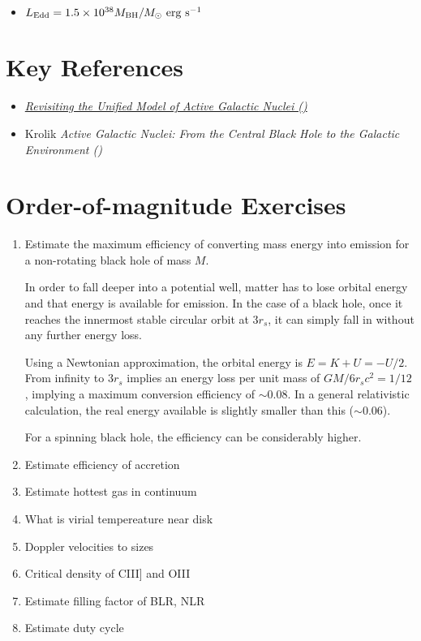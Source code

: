 \begin{itemize}
\item $L_{\rm Edd} = 1.5 \times 10^{38} M_{\rm BH} / M_\odot {\rm
~erg~s}^{-1}$
\end{itemize}

\section{Key References}

\begin{itemize}
  \item
    \href{https://ui.adsabs.harvard.edu/abs/2015ARA%26A..53..365N/abstract}
    {{\it Revisiting the Unified Model of Active Galactic Nuclei
      (\citealt{netzer15a})}}
  \item
    Krolik {\it Active Galactic Nuclei: From the Central Black Hole to
    the Galactic Environment (\citealt{krolik99a})}
\end{itemize}

\section{Order-of-magnitude Exercises}

\begin{enumerate} 
\item Estimate the maximum efficiency of converting mass energy
    into emission for a non-rotating black hole of mass $M$.

\begin{answer}
In order to fall deeper into a potential well, matter has to lose
orbital energy and that energy is available for emission. In the case
of a black hole, once it reaches the innermost stable circular orbit
at $3r_s$, it can simply fall in without any further energy loss.

Using a Newtonian approximation, the orbital energy is $E = K + U =
-U/2$. From infinity to $3r_s$ implies an energy loss per unit mass of
$GM/6r_sc^2 = 1 / 12$, implying a maximum conversion efficiency of
$\sim 0.08$. In a general relativistic calculation, the real energy
available is slightly smaller than this ($\sim 0.06$).

For a spinning black hole, the efficiency can be considerably higher.
\end{answer}

\item Estimate efficiency of accretion
\item Estimate hottest gas in continuum
\item What is virial tempereature near disk
\item Doppler velocities to sizes
\item Critical density of CIII] and OIII
\item Estimate filling factor of BLR, NLR
\item Estimate duty cycle
\end{enumerate} 

